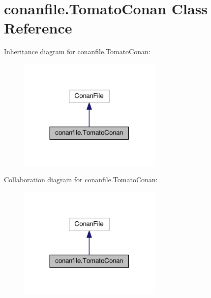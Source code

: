 \hypertarget{classconanfile_1_1_tomato_conan}{}\section{conanfile.\+Tomato\+Conan Class Reference}
\label{classconanfile_1_1_tomato_conan}


Inheritance diagram for conanfile.\+Tomato\+Conan\+:
\nopagebreak
\begin{figure}[H]
\begin{center}
\leavevmode
\includegraphics[width=200pt]{classconanfile_1_1_tomato_conan__inherit__graph}
\end{center}
\end{figure}


Collaboration diagram for conanfile.\+Tomato\+Conan\+:
\nopagebreak
\begin{figure}[H]
\begin{center}
\leavevmode
\includegraphics[width=200pt]{classconanfile_1_1_tomato_conan__coll__graph}
\end{center}
\end{figure}
